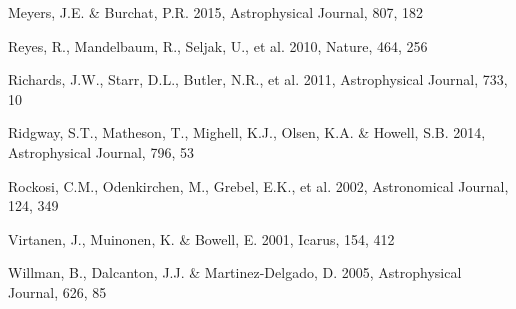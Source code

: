 \documentclass{iau}
\begin{document}
\begin{thebibliography}{}
\bibitem[()]{} Meyers, J.E. \& Burchat, P.R. 2015, Astrophysical Journal, 807, 182 

\bibitem[()]{} Reyes, R., Mandelbaum, R., Seljak, U., et al. 2010, Nature, 464, 256 

\bibitem[()]{} Richards, J.W., Starr, D.L., Butler, N.R., et al. 2011, Astrophysical Journal, 733, 10 

\bibitem[()]{} Ridgway, S.T., Matheson, T., Mighell, K.J., Olsen, K.A. \& Howell, S.B. 2014, Astrophysical Journal, 796, 53

\bibitem[()]{} Rockosi, C.M., Odenkirchen, M., Grebel, E.K., et al. 2002, Astronomical Journal, 124, 349

\bibitem[()]{} Virtanen, J., Muinonen, K. \& Bowell, E. 2001, Icarus, 154, 412

\bibitem[()]{} Willman, B., Dalcanton, J.J. \& Martinez-Delgado, D. 2005, Astrophysical Journal, 626, 85

\end{thebibliography}
\end{document}
